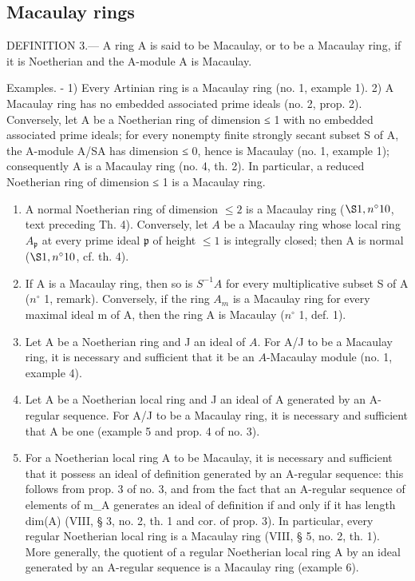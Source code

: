 \subsection{Macaulay rings}

DEFINITION 3.--- A ring A is said to be Macaulay, or to be a Macaulay ring, if it is Noetherian and the A-module A is Macaulay.

Examples. - 1) Every Artinian ring is a Macaulay ring (no. 1, example 1). 2) A Macaulay ring has no embedded associated prime ideals (no. 2, prop. 2). Conversely, let A be a Noetherian ring of dimension ≤ 1 with no embedded associated prime ideals; for every nonempty finite strongly secant subset S of A, the A-module A/SA has dimension ≤ 0, hence is Macaulay (no. 1, example 1); consequently A is a Macaulay ring (no. 4, th. 2). In particular, a reduced Noetherian ring of dimension ≤ 1 is a Macaulay ring.

\begin{enumerate}
\def\labelenumi{\arabic{enumi})}
\setcounter{enumi}{2}
\item
  A normal Noetherian ring of dimension \(\leqslant 2\) is a Macaulay ring (\(\S 1, n^{\circ} 10\), text preceding Th. 4). Conversely, let \(A\) be a Macaulay ring whose local ring \(A_{\mathfrak{p}}\) at every prime ideal \(\mathfrak{p}\) of height \(\leqslant 1\) is integrally closed; then A is normal (\(\S 1, n^{\circ} 10\), cf. th. 4).
\item
  If A is a Macaulay ring, then so is \(S^{-1}A\) for every multiplicative subset S of A (\(n^{\circ}\) 1, remark). Conversely, if the ring \(A_{m}\) is a Macaulay ring for every maximal ideal m of A, then the ring A is Macaulay (\(n^{\circ}\) 1, def. 1).
\item
  Let A be a Noetherian ring and J an ideal of \(A\). For A/J to be a Macaulay ring, it is necessary and sufficient that it be an \(A\)-Macaulay module (no. 1, example 4).
\item
  Let A be a Noetherian local ring and J an ideal of A generated by an A-regular sequence. For A/J to be a Macaulay ring, it is necessary and sufficient that A be one (example 5 and prop. 4 of no. 3).
\item
  For a Noetherian local ring A to be Macaulay, it is necessary and sufficient that it possess an ideal of definition generated by an A-regular sequence: this follows from prop. 3 of no. 3, and from the fact that an A-regular sequence of elements of m\_A generates an ideal of definition if and only if it has length dim(A) (VIII, § 3, no. 2, th. 1 and cor. of prop. 3). In particular, every regular Noetherian local ring is a Macaulay ring (VIII, § 5, no. 2, th. 1). More generally, the quotient of a regular Noetherian local ring A by an ideal generated by an A-regular sequence is a Macaulay ring (example 6).
\end{enumerate}

